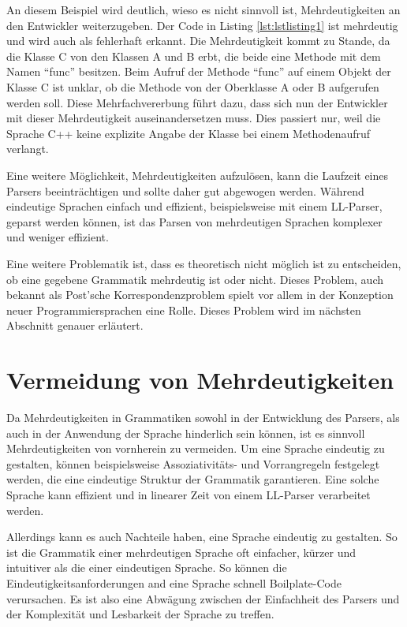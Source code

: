 \documentclass[runningheads]{llncs}
\begin{document}
	An diesem Beispiel wird deutlich,
	wieso es nicht sinnvoll ist, Mehrdeutigkeiten an den Entwickler weiterzugeben.
	Der Code in Listing \ref{lst:lstlisting1} ist mehrdeutig und wird auch als fehlerhaft erkannt.
	Die Mehrdeutigkeit kommt zu Stande, da die Klasse C von den Klassen A und B erbt,
	die beide eine Methode mit dem Namen ``func'' besitzen.
	Beim Aufruf der Methode ``func'' auf einem Objekt der Klasse C ist unklar,
	ob die Methode von der Oberklasse A oder B aufgerufen werden soll.
	Diese Mehrfachvererbung führt dazu, dass sich nun der Entwickler mit dieser Mehrdeutigkeit auseinandersetzen muss.
	Dies passiert nur, weil die Sprache C++ keine explizite Angabe der Klasse bei einem Methodenaufruf verlangt.

	Eine weitere Möglichkeit, Mehrdeutigkeiten aufzulösen, kann die Laufzeit eines Parsers beeinträchtigen
	und sollte daher gut abgewogen werden.
	Während eindeutige Sprachen einfach und effizient, beispielsweise mit einem LL-Parser, geparst werden können,
	ist das Parsen von mehrdeutigen Sprachen komplexer und weniger effizient.

	Eine weitere Problematik ist, dass es theoretisch nicht möglich ist zu entscheiden,
	ob eine gegebene Grammatik mehrdeutig ist oder nicht.
	Dieses Problem, auch bekannt als Post'sche Korrespondenzproblem
	spielt vor allem in der Konzeption neuer Programmiersprachen eine Rolle.
	Dieses Problem wird im nächsten Abschnitt genauer erläutert.


	\section{Vermeidung von Mehrdeutigkeiten}

	Da Mehrdeutigkeiten in Grammatiken sowohl in der Entwicklung des Parsers,
	als auch in der Anwendung der Sprache hinderlich sein können,
	ist es sinnvoll Mehrdeutigkeiten von vornherein zu vermeiden.
	Um eine Sprache eindeutig zu gestalten,
	können beispielsweise Assoziativitäts- und Vorrangregeln festgelegt werden,
	die eine eindeutige Struktur der Grammatik garantieren. \cite{wharton1976}
	Eine solche Sprache kann effizient und in linearer Zeit von einem LL-Parser verarbeitet werden.

	Allerdings kann es auch Nachteile haben, eine Sprache eindeutig zu gestalten.
	So ist die Grammatik einer mehrdeutigen Sprache oft einfacher, kürzer und intuitiver als die einer eindeutigen Sprache.
	So können die Eindeutigkeitsanforderungen and eine Sprache schnell Boilplate-Code verursachen.
	Es ist also eine Abwägung zwischen der Einfachheit des Parsers und der Komplexität und Lesbarkeit der Sprache zu treffen.
\end{document}
